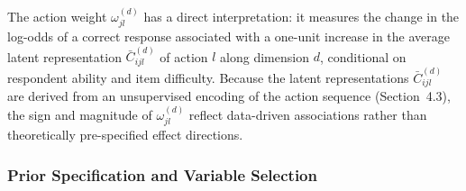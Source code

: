 \documentclass[A4paper,11pt]{article}
\begin{document}
The action weight $\omega_{jl}^{(d)}$ has a direct interpretation: it measures the change in the log-odds of a correct response associated with a one-unit increase in the average latent representation $\bar{C}_{ijl}^{(d)}$ of action $l$ along dimension $d$, conditional on respondent ability and item difficulty. Because the latent representations $\bar{C}_{ijl}^{(d)}$ are derived from an unsupervised encoding of the action sequence (Section~4.3), the sign and magnitude of $\omega_{jl}^{(d)}$ reflect data-driven associations rather than theoretically pre-specified effect directions.

\subsubsection{Prior Specification and Variable Selection}
\end{document}
